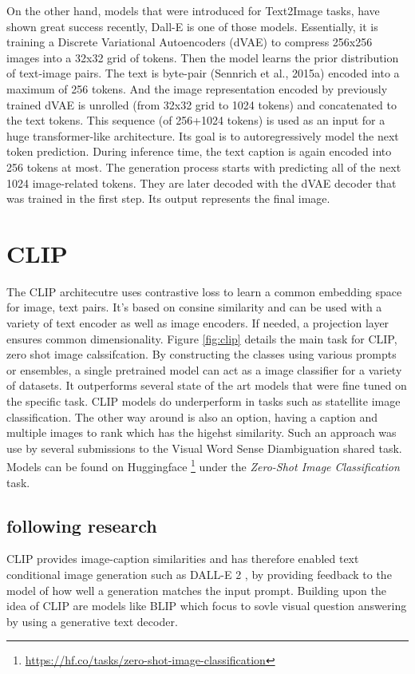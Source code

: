 \documentclass[11pt,a4paper]{article}
\begin{document}
On the other hand, models that were introduced for Text2Image tasks, have shown great success recently, Dall-E \cite{ramesh2021zeroshot} is one of those models. Essentially, it is training a Discrete Variational Autoencoders (dVAE) to compress 256x256 images into a 32x32 grid of tokens. Then the model learns the prior distribution of text-image pairs. The text is byte-pair (Sennrich et al., 2015a) encoded into a maximum of 256 tokens. And the image representation encoded by previously trained dVAE is unrolled (from 32x32 grid to 1024 tokens) and concatenated to the text tokens. This sequence (of 256+1024 tokens) is used as an input for a huge transformer-like architecture. Its goal is to autoregressively model the next token prediction. During inference time, the text caption is again encoded into 256 tokens at most. The generation process starts with predicting all of the next 1024 image-related tokens. They are later decoded with the dVAE decoder that was trained in the first step. Its output represents the final image.

\section{CLIP} 
The CLIP \cite{radford2021learning} architecutre uses contrastive loss to learn a common embedding space for image, text pairs.
It's based on consine similarity and can be used with a variety of text encoder as well as image encoders. %
If needed, a projection layer ensures common dimensionality.
Figure \ref{fig:clip} details the main task for CLIP, zero shot image calssifcation.
By constructing the classes using various prompts or ensembles, a single pretrained model can act as a image classifier for a variety of datasets.
It outperforms several state of the art models that were fine tuned on the specific task.
CLIP models do underperform in tasks such as statellite image classification.
The other way around is also an option, having a caption and multiple images to rank which has the higehst similarity.
Such an approach was use by several submissions to the Visual Word Sense Diambiguation \cite{raganato-etal-2023-semeval} shared task.
Models can be found on Huggingface \footnote[1]{\url{https://hf.co/tasks/zero-shot-image-classification}} under the \emph{Zero-Shot Image Classification} task.

\subsection{following research} %
CLIP provides image-caption similarities and has therefore enabled text conditional image generation such as DALL-E 2 \cite{ramesh2022hierarchical}, by providing feedback to the model of how well a generation matches the input prompt.
Building upon the idea of CLIP are models like BLIP\cite{li2022blip} which focus to sovle visual question answering by using a generative text decoder.




\appendix
\end{document}
